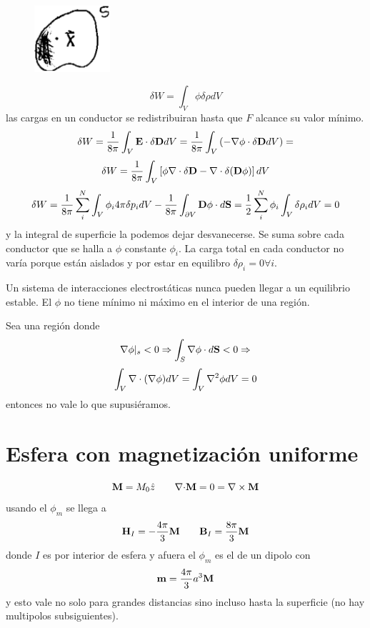 \documentclass[10pt,oneside]{CBFT_book}
\begin{document}
\begin{figure}[htb]
	\begin{center}
	\includegraphics[width=0.25\textwidth]{images/fig_ft1_volume.pdf}	 
	\end{center}
	\caption{}
\end{figure} 

\[
	\delta W = \int_V \phi \delta \rho dV 
\]
las cargas en un conductor se redistribuiran hasta que $F$ alcance su valor mínimo.
\[
	\delta W = \frac{1}{8\pi} \int_V \vb{E}\cdot\delta\vb{D} dV = \frac{1}{8\pi} \int_V \left( 
-\Nabla\phi\cdot\delta\vb{D}  dV \right)  = 
\]
\[
	\delta W = \frac{1}{8\pi} \int_V \left[ \phi \Nabla\cdot\delta\vb{D} - 
			\Nabla\cdot\delta(\vb{D}\phi) \right] dV
\]
\[
	\delta W = \frac{1}{8\pi} \sum_i^N \int_V \phi_i 4\pi \delta p_i dV - 
		\frac{1}{8\pi} \int_{\partial V} \vb{D}\phi \cdot d\vb{S} =
		\frac{1}{2} \sum_i^N  \phi_i \int_V \delta \rho_i dV = 0
\]
y la integral de superficie la podemos dejar desvanecerse. Se suma sobre cada conductor 
que se halla a $\phi$ constante $\phi_i$.
La carga total en cada conductor no varía porque están aislados y por estar en 
equilibro $\delta \rho_i = 0 \forall i$.

Un sistema de interacciones electrostáticas nunca pueden llegar a un equilibrio estable.
El $\phi$ no tiene mínimo ni máximo en el interior de una región.

Sea una región donde 
\[
	\Nabla\phi |_s < 0 \Rightarrow \int_S \Nabla\phi\cdot d\vb{S} < 0 \Rightarrow
\]
\[
	\int_V \mathbf{\nabla}\cdot(\mathbf{\nabla}\phi) dV = \int_V \nabla^2 \phi dV = 0
\]
entonces no vale lo que supusiéramos.

\section{Esfera con magnetización uniforme}
\[
	\vb{M} = M_0 \hat{z} \qquad \divem{M}= 0 = \rotorm{M}
\]
usando el $\phi_m$ se llega a
\[
	\vb{H}_I = -\frac{4\pi}{3}\vb{M} \qquad \vb{B}_I = \frac{8\pi}{3}\vb{M}
\]
donde $I$ es por interior de esfera y afuera el $\phi_m$ es el de un dipolo con 
\[
	\vb{m} = \frac{4\pi}{3}a^3\vb{M}
\]
y esto vale no solo para grandes distancias sino incluso hasta la superficie (no hay multipolos
subsiguientes).
\end{document}
